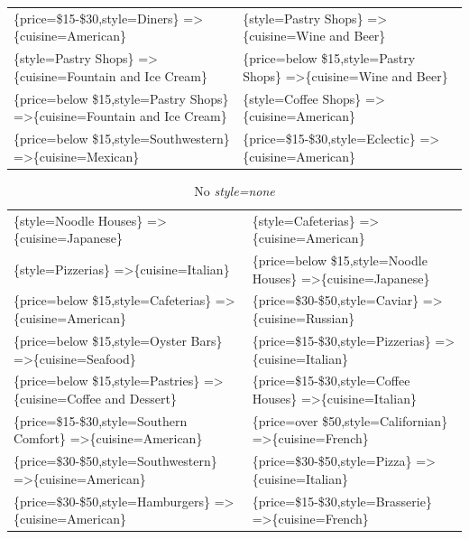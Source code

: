 \documentclass[letterpaper,10pt]{article}
\begin{document}
\begin{appendices}
\begin{table}[h]
\begin{adjustbox}{max width=\textwidth}
\begin{tabular}{ll}
\{price=\$15-\$30,style=Diners\} =\textgreater \{cuisine=American\} & \{style=Pastry Shops\} =\textgreater \{cuisine=Wine and Beer\} \\ 
\{style=Pastry Shops\} =\textgreater \{cuisine=Fountain and Ice Cream\} & \{price=below \$15,style=Pastry Shops\} =\textgreater \{cuisine=Wine and Beer\} \\ 
\{price=below \$15,style=Pastry Shops\} =\textgreater \{cuisine=Fountain and Ice Cream\} & \{style=Coffee Shops\} =\textgreater \{cuisine=American\} \\ 
\{price=below \$15,style=Southwestern\} =\textgreater \{cuisine=Mexican\} & \{price=\$15-\$30,style=Eclectic\} =\textgreater \{cuisine=American\} \\ 
\end{tabular}
\end{adjustbox}
\end{table}
\begin{table}[h]
\caption*{No \textit{style=none}}
\begin{adjustbox}{max width=\textwidth}
\begin{tabular}{ll}
\{style=Noodle Houses\} =\textgreater \{cuisine=Japanese\} & \{style=Cafeterias\} =\textgreater \{cuisine=American\} \\ 
\{style=Pizzerias\} =\textgreater \{cuisine=Italian\} & \{price=below \$15,style=Noodle Houses\} =\textgreater \{cuisine=Japanese\} \\ 
\{price=below \$15,style=Cafeterias\} =\textgreater \{cuisine=American\} & \{price=\$30-\$50,style=Caviar\} =\textgreater \{cuisine=Russian\} \\ 
\{price=below \$15,style=Oyster Bars\} =\textgreater \{cuisine=Seafood\} & \{price=\$15-\$30,style=Pizzerias\} =\textgreater \{cuisine=Italian\} \\ 
\{price=below \$15,style=Pastries\} =\textgreater \{cuisine=Coffee and Dessert\} & \{price=\$15-\$30,style=Coffee Houses\} =\textgreater \{cuisine=Italian\} \\ 
\{price=\$15-\$30,style=Southern Comfort\} =\textgreater \{cuisine=American\} & \{price=over \$50,style=Californian\} =\textgreater \{cuisine=French\} \\ 
\{price=\$30-\$50,style=Southwestern\} =\textgreater \{cuisine=American\} & \{price=\$30-\$50,style=Pizza\} =\textgreater \{cuisine=Italian\} \\ 
\{price=\$30-\$50,style=Hamburgers\} =\textgreater \{cuisine=American\} & \{price=\$15-\$30,style=Brasserie\} =\textgreater \{cuisine=French\} \\ 

\end{tabular}
\end{adjustbox}
\end{table}
\end{appendices}
\end{document}
